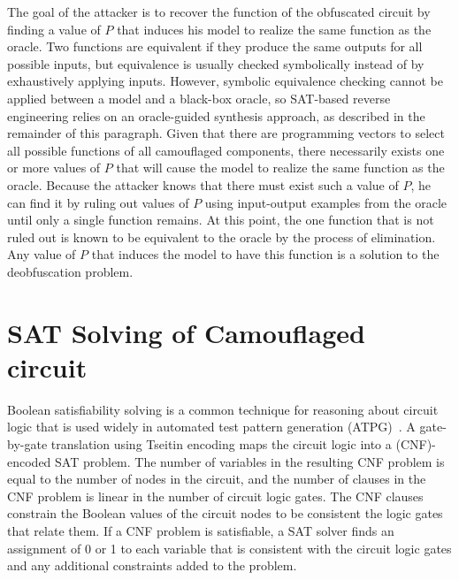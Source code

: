 \documentclass[proposal]{umassthesis}  %
\begin{document}
The goal of the attacker is to recover the function of the obfuscated circuit by finding a value of $P$ that induces his model to realize the same function as the oracle. Two functions are equivalent if they produce the same outputs for all possible inputs, but equivalence is usually checked symbolically instead of by exhaustively applying inputs. However, symbolic equivalence checking cannot be applied between a model and a black-box oracle, so SAT-based reverse engineering relies on an oracle-guided synthesis approach, as described in the remainder of this paragraph. Given that there are programming vectors to select all possible functions of all camouflaged components, there necessarily exists one or more values of $P$ that will cause the model to realize the same function as the oracle. Because the attacker knows that there must exist such a value of $P$, he can find it by ruling out values of $P$ using input-output examples from the oracle until only a single function remains. At this point, the one function that is not ruled out is known to be equivalent to the oracle by the process of elimination. Any value of $P$ that induces the model to have this function is a solution to the deobfuscation problem.

















\section{SAT Solving of Camouflaged circuit}
Boolean satisfiability solving is a common technique for reasoning about circuit logic that is used widely in automated test pattern generation (ATPG)~\cite{larrabee-92}. A gate-by-gate translation using Tseitin encoding maps the circuit logic into a (CNF)-encoded SAT problem. The number of variables in the resulting CNF problem is equal to the number of nodes in the circuit, and the number of clauses in the CNF problem is linear in the number of circuit logic gates. The CNF clauses constrain the Boolean values of the circuit nodes to be consistent the logic gates that relate them. If a CNF problem is satisfiable, a SAT solver finds an assignment of 0 or 1 to each variable that is consistent with the circuit logic gates and any additional constraints added to the problem.
\end{document}
